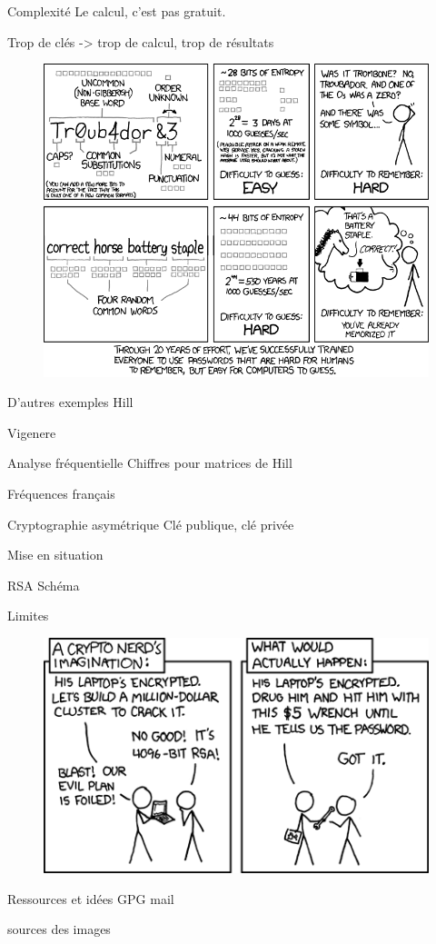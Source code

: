 \documentclass{beamer}
\begin{document}
\begin{frame}{Complexité}
  Le calcul, c'est pas gratuit.

  Trop de clés -> trop de calcul, trop de résultats
  
  \begin{figure}
  \centering
  \includegraphics[scale = 0.35]{xkcdpassword_strength.png}
  \end{figure}
  \end{frame}

\begin{frame}{D'autres exemples}
  Hill

  Vigenere
  \end{frame}

\begin{frame}{Analyse fréquentielle}
  Chiffres pour matrices de Hill

  Fréquences français
  \end{frame}


\begin{frame}{Cryptographie asymétrique}
  Clé publique, clé privée

  Mise en situation
\end{frame}

\begin{frame}{RSA}
  Schéma
  \end{frame}

\begin{frame}{Limites}
  \begin{figure}
    \centering
    \includegraphics[scale = 0.5]{xkcdsecurity.png}
  \end{figure}
\end{frame}

\begin{frame}{Ressources et idées}
  GPG mail
  
  sources des images
  \end{frame}
\end{document}
